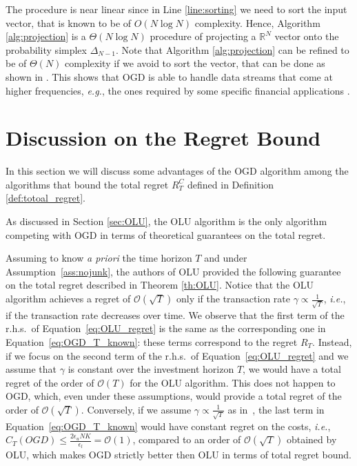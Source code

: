 The procedure is near linear since in Line \ref{line:sorting} we need to sort the input vector, that is known to be of $O(N\log N)$ complexity. Hence, Algorithm \ref{alg:projection} is a $\Theta(N\log N)$ procedure of projecting a $\mathbb R^N$ vector onto the probability simplex $\Delta_{N-1}$. Note that Algorithm \ref{alg:projection} can be refined to be of $\Theta(N)$ complexity if we avoid to sort the vector, that can be done as shown in \cite{duchi2008efficient}.
This shows that OGD is able to handle data streams that come at higher frequencies, \emph{e.g.}, the ones required by some specific financial applications \cite{abernethy2013adaptive}.

\section{Discussion on the Regret Bound}

In this section we will discuss some advantages of the OGD algorithm among the algorithms that bound the total regret $R_T^C$ defined in Definition \ref{def:totoal_regret}.

As discussed in Section \ref{sec:OLU}, the OLU algorithm is the only algorithm competing with OGD in terms of theoretical guarantees on the total regret.

Assuming to know \emph{a priori} the time horizon $T$ and under Assumption~\ref{ass:nojunk}, the authors of OLU provided the following guarantee on the total regret described in Theorem \ref{th:OLU}.
Notice that the OLU algorithm achieves a regret of $\mathcal{O}(\sqrt T)$ only if the transaction rate $\gamma \propto \frac{1}{\sqrt{T}}$, \emph{i.e.}, if the transaction rate decreases over time.
We observe that the first term of the r.h.s.~of Equation~\eqref{eq:OLU_regret} is the same as the corresponding one in Equation~\eqref{eq:OGD_T_known}: these terms correspond to the regret $R_T$.
Instead, if we focus on the second term of the r.h.s.~of Equation~\eqref{eq:OLU_regret} and we assume that $\gamma$ is constant over the investment horizon $T$, we would have a total regret of the order of $\mathcal{O}(T)$ for the OLU algorithm.
This does not happen to OGD, which, even under these assumptions, would provide a total regret of the order of $\mathcal{O}(\sqrt{T})$.
Conversely, if we assume $\gamma \propto \frac{1}{\sqrt{T}}$ as in~\cite{das2013online}, the last term in Equation~\eqref{eq:OGD_T_known} would have constant regret on the costs, \emph{i.e.}, $C_T(OGD)\le\frac{2 \epsilon_u N K}{\epsilon_l} = \mathcal{O}(1)$, compared to an order of $ \mathcal{O}(\sqrt{T})$ obtained by OLU, which makes OGD strictly better then OLU in terms of total regret bound.



